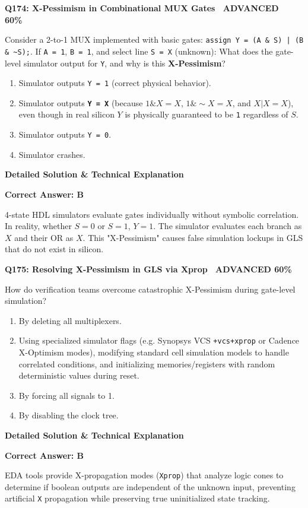 \documentclass[11pt,a4paper]{article}
\newcommand{\badgeadv}{{\color{white}\colorbox{advred}{\bfseries\sffamily\tiny\ ADVANCED 60\%\ }}}
\newenvironment{qbox}[2]{%
  \begin{mdframed}[style=qstyle]%
  {\bfseries\sffamily\color{primaryblue}#1 \hfill #2}\par\vspace{2pt}%
}{%
  \end{mdframed}%
}
\newenvironment{ansbox}{%
  \begin{mdframed}[style=ansstyle]%
  {\bfseries\sffamily\color{ansgreen}\small Detailed Solution \& Technical Explanation}\par\vspace{2pt}\small%
}{%
  \end{mdframed}%
}
\begin{document}
\begin{qbox}{Q174: X-Pessimism in Combinational MUX Gates}{\badgeadv}
Consider a 2-to-1 MUX implemented with basic gates: \texttt{assign Y = (A \& S) | (B \& \textasciitilde S);}.  
If \texttt{A = 1}, \texttt{B = 1}, and select line \texttt{S = X} (unknown):
What does the gate-level simulator output for \texttt{Y}, and why is this \textbf{X-Pessimism}?
\begin{enumerate}[label=\textbf{\Alph*.}]
  \item Simulator outputs \texttt{Y = 1} (correct physical behavior).
  \item Simulator outputs \textbf{\texttt{Y = X}} (because $1 \& X = X$, $1 \& \sim X = X$, and $X | X = X$), even though in real silicon $Y$ is physically guaranteed to be \texttt{1} regardless of $S$.
  \item Simulator outputs \texttt{Y = 0}.
  \item Simulator crashes.
\end{enumerate}
\end{qbox}
\begin{ansbox}
\textbf{Correct Answer: B}

4-state HDL simulators evaluate gates individually without symbolic correlation. In reality, whether $S=0$ or $S=1$, $Y=1$. The simulator evaluates each branch as $X$ and their OR as $X$. This "X-Pessimism" causes false simulation lockups in GLS that do not exist in silicon.
\end{ansbox}

\begin{qbox}{Q175: Resolving X-Pessimism in GLS via Xprop}{\badgeadv}
How do verification teams overcome catastrophic X-Pessimism during gate-level simulation?
\begin{enumerate}[label=\textbf{\Alph*.}]
  \item By deleting all multiplexers.
  \item Using specialized simulator flags (e.g. Synopsys VCS \texttt{+vcs+xprop} or Cadence X-Optimism modes), modifying standard cell simulation models to handle correlated conditions, and initializing memories/registers with random deterministic values during reset.
  \item By forcing all signals to 1.
  \item By disabling the clock tree.
\end{enumerate}
\end{qbox}
\begin{ansbox}
\textbf{Correct Answer: B}

EDA tools provide X-propagation modes (\texttt{Xprop}) that analyze logic cones to determine if boolean outputs are independent of the unknown input, preventing artificial \texttt{X} propagation while preserving true uninitialized state tracking.
\end{ansbox}
\end{document}
